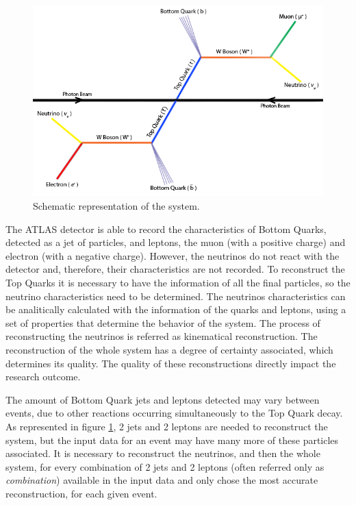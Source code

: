 \begin{figure}[!htp]
	\begin{center}
		\includegraphics[scale=0.5]{../../common/img/ttbar.png}
		\caption{Schematic representation of the \ttbar system.}
		\label{fig:TopQuarkDecay}
	\end{center}
\end{figure}

The ATLAS detector is able to record the characteristics of Bottom Quarks, detected as a jet of particles, and leptons, the muon (with a positive charge) and electron (with a negative charge). However, the neutrinos do not react with the detector and, therefore, their characteristics are not recorded. To reconstruct the Top Quarks it is necessary to have the information of all the final particles, so the neutrino characteristics need to be determined. The neutrinos characteristics can be analitically calculated with the information of the quarks and leptons, using a set of properties that determine the behavior of the \ttbar system. The process of reconstructing the neutrinos is referred as kinematical reconstruction. The reconstruction of the whole \ttbar system has a degree of certainty associated, which determines its quality. The quality of these reconstructions directly impact the research outcome.

The amount of Bottom Quark jets and leptons detected may vary between events, due to other reactions occurring simultaneously to the Top Quark decay. As represented in figure \ref{fig:TopQuarkDecay}, 2 jets and 2 leptons are needed to reconstruct the \ttbar system, but the input data for an event may have many more of these particles associated. It is necessary to reconstruct the neutrinos, and then the whole system, for every combination of 2 jets and 2 leptons (often referred only as \textit{combination}) available in the input data and only chose the most accurate reconstruction, for each given event.

